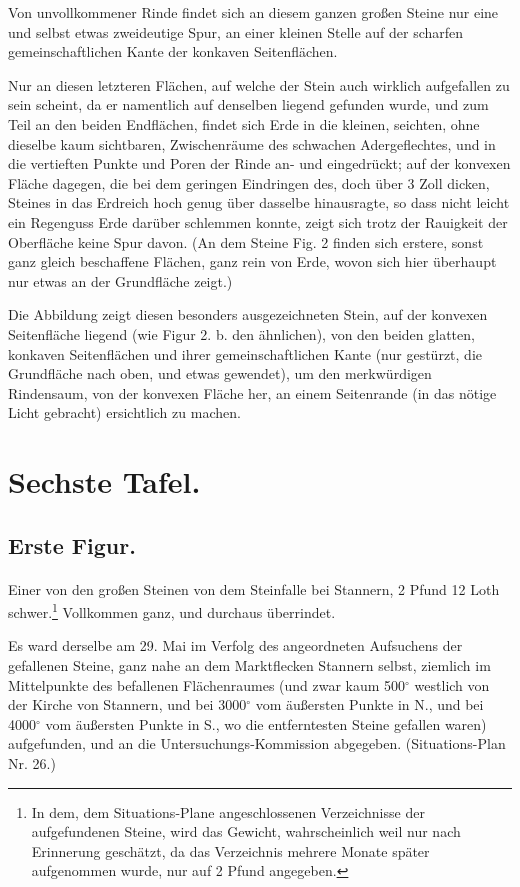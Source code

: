 \documentclass[a4paper, 11pt, oneside, german]{article}
\begin{document}
Von unvollkommener Rinde findet sich an diesem ganzen großen Steine nur eine und selbst etwas zweideutige Spur, an einer kleinen Stelle auf der scharfen gemeinschaftlichen Kante der konkaven Seitenflächen.

Nur an diesen letzteren Flächen, auf welche der Stein auch wirklich aufgefallen zu sein scheint, da er namentlich auf denselben liegend gefunden wurde, und zum Teil an den beiden Endflächen, findet sich Erde in die kleinen, seichten, ohne dieselbe kaum sichtbaren, Zwischenräume des schwachen Adergeflechtes, und in die vertieften Punkte und Poren der Rinde an- und eingedrückt; auf der konvexen Fläche dagegen, die bei dem geringen Eindringen des, doch über 3 Zoll dicken, Steines in das Erdreich hoch genug über dasselbe hinausragte, so dass nicht leicht ein Regenguss Erde darüber schlemmen konnte, zeigt sich trotz der Rauigkeit der Oberfläche keine Spur davon. (An dem Steine Fig. 2 finden sich erstere, sonst ganz gleich beschaffene Flächen, ganz rein von Erde, wovon sich hier überhaupt nur etwas an der Grundfläche zeigt.)

Die Abbildung zeigt diesen besonders ausgezeichneten Stein, auf der konvexen Seitenfläche liegend (wie Figur 2. b. den ähnlichen), von den beiden glatten, konkaven Seitenflächen und ihrer gemeinschaftlichen Kante (nur gestürzt, die Grundfläche nach oben, und etwas gewendet), um den merkwürdigen Rindensaum, von der konvexen Fläche her, an einem Seitenrande (in das nötige Licht gebracht) ersichtlich zu machen.
\clearpage
\section{Sechste Tafel.}
\subsection{Erste Figur.}
\paragraph{}
Einer von den großen Steinen von dem Steinfalle bei Stannern, 2 Pfund 12 Loth schwer.\footnote{In dem, dem Situations-Plane angeschlossenen Verzeichnisse der aufgefundenen Steine, wird das Gewicht, wahrscheinlich weil nur nach Erinnerung geschätzt, da das Verzeichnis mehrere Monate später aufgenommen wurde, nur auf 2 Pfund angegeben.} Vollkommen ganz, und durchaus überrindet.

Es ward derselbe am 29. Mai im Verfolg des angeordneten Aufsuchens der gefallenen Steine, ganz nahe an dem Marktflecken Stannern selbst, ziemlich im Mittelpunkte des befallenen Flächenraumes (und zwar kaum 500$^{\circ}$ westlich von der Kirche von Stannern, und bei 3000$^{\circ}$ vom äußersten Punkte in N., und bei 4000$^{\circ}$ vom äußersten Punkte in S., wo die entferntesten Steine gefallen waren) aufgefunden, und an die Untersuchungs-Kommission abgegeben. (Situations-Plan Nr. 26.)
\end{document}
